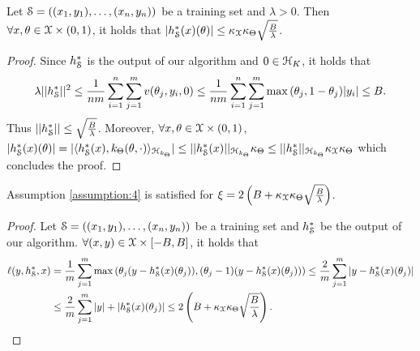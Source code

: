\begin{lemma} \label{lemma:majorant_h} Let $\mathcal{S}=((x_1,y_1),\ldots,(x_n,y_n))$ be a training set and
$\lambda > 0$. Then $\forall x , \theta \in \mathcal{X} \times (0,1)$, it holds that
$|h^{*}_{\mathcal{S}}(x)(\theta)| \leq \kappa_{\mathcal{X}} \kappa_{\Theta} \sqrt{\frac{B}{\lambda}}$.
\end{lemma}
\begin{proof} Since $h^{*}_{\mathcal{S}}$ is the output of our algorithm and $0 \in \mathcal{H}_K$,
it holds that
\begin{dmath*}[compact]
\lambda ||\minimizer{h}_{\trainingset}||^2 \leq \frac{1}{nm} \sum_{i=1}^n \sum_{j=1}^m  \hcost(\hyperparameter_j,y_i,0)
\leq \frac{1}{nm} \sum_{i=1}^n \sum_{j=1}^m \max{(\hyperparameter_j,1-\hyperparameter_j)} |y_i|
\leq B.
\end{dmath*}
Thus $||h^{*}_{\mathcal{S}}|| \leq \sqrt{\frac{B}{\lambda}}$. Moreover,
$\forall x , \theta \in \mathcal{X} \times (0,1)$,
$|h^{*}_{\mathcal{S}}(x)(\theta)| =
|\langle h^{*}_{\mathcal{S}}(x),k_{\Theta}(\theta,\cdot) \rangle_{\mathcal{H}_{k_{\Theta}}}|
\leq ||h^{*}_{\mathcal{S}}(x)||_{\mathcal{H}_{k_{\Theta}}} \kappa_{\Theta}
\leq ||h^{*}_{\mathcal{S}}||_{\mathcal{H}_{k_{\Theta}}} \kappa_{\mathcal{X}} \kappa_{\Theta}$
which concludes the proof.
\end{proof}

\begin{lemma} \label{lemma:xi_qr} Assumption \ref{assumption:4} is satisfied for
  $\xi = 2\left(B + \kappa_{\mathcal{X}} \kappa_{\Theta} \sqrt{\frac{B}{\lambda}}\right)$.
\end{lemma}

\begin{proof}Let $\mathcal{S} = ((x_1,y_1),\ldots,(x_n,y_n))$ be a training set and
$h^{*}_{\mathcal{S}}$ be the output of our algorithm.
  $\forall (x,y) \in \mathcal{X} \times [-B,B]$, it holds that
  \begin{align*}
    \ell(y,\minimizer{h}_{\trainingset},x) &=
    \frac{1}{m} \sum_{j=1}^m \max{(\theta_j(y-\minimizer{h}_{\trainingset}(x)(\theta_j)),(\theta_j-1)(y-\minimizer{h}_{\trainingset}(x)(\theta_j)))}
    \leq \frac{2}{m} \sum_{j=1}^m |y-\minimizer{h}_{\trainingset}(x)(\theta_j)| \\
    &\leq \frac{2}{m} \sum_{j=1}^m |y| + |\minimizer{h}_{\trainingset}(x)(\theta_j)|
    \leq 2\left (B + \kappa_{\mcX} \kappa_{\hyperparameterspace} \sqrt{\frac{B}{\lambda}}\right).
  \end{align*}
\end{proof}

